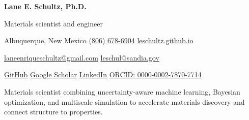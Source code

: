 \documentclass[letterpaper,11pt]{article}
\newcommand{\name}{Lane E. Schultz, Ph.D.}
\begin{document}
\RaggedRight
\thispagestyle{firstpage}

{\fontsize{28}{32}\selectfont\bfseries\color{ink}\name\par}
\vspace{0.3em}
{\large\color{highlight}Materials scientist and engineer\par}
\vspace{0.55em}
{\small
Albuquerque, New Mexico\enspace\textbar\enspace
\href{tel:+18066786904}{(806) 678-6904}\enspace\textbar\enspace
\href{https://leschultz.github.io}{leschultz.github.io}\par
\href{mailto:laneenriqueschultz@gmail.com}{laneenriqueschultz@gmail.com}\enspace\textbar\enspace
\href{mailto:leschul@sandia.gov}{leschul@sandia.gov}\par
\href{https://github.com/leschultz}{GitHub}\enspace\textbar\enspace
\href{https://scholar.google.com/citations?user=8WyBz08AAAAJ}{Google Scholar}\enspace\textbar\enspace
\href{https://www.linkedin.com/in/lane-schultz-983920236/}{LinkedIn}\enspace\textbar\enspace
\href{https://orcid.org/0000-0002-7870-7714}{ORCID: 0000-0002-7870-7714}\par
}

\vspace{0.7em}
Materials scientist combining uncertainty-aware machine learning, Bayesian optimization, and
multiscale simulation to accelerate materials discovery and connect structure to properties.












\end{document}
